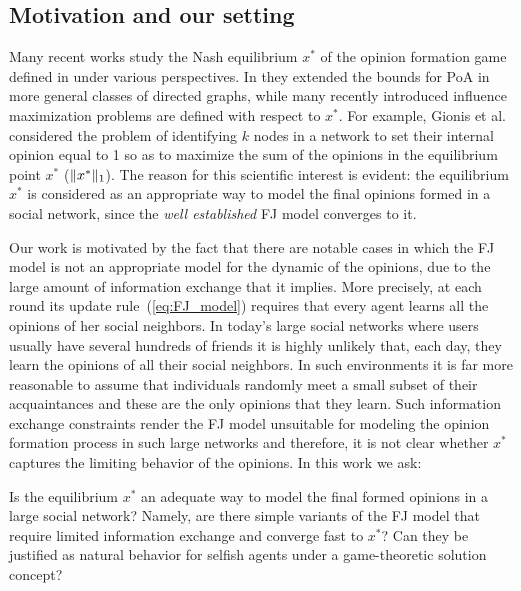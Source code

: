 \subsection{Motivation and our setting}

Many recent works study the Nash equilibrium $x^*$ of the opinion formation
game defined in \cite{BKO11} under various perspectives. In \cite{CCL16} they
extended the bounds for PoA in more general classes of directed graphs, while
many recently introduced influence maximization problems
\cite{GTT13,AKPT18,MMT17} are defined with respect to $x^*$.  For example,
Gionis et al. \cite{GTT13} considered the problem of identifying $k$ nodes in a
network to set their internal opinion equal to 1 so as to maximize the sum of
the opinions in the equilibrium point $x^*$ ($\norm{1}{x^*}$).  The reason for
this scientific interest is evident: the equilibrium $x^*$ is considered as an
appropriate way to model the final opinions formed in a social network, since
the \emph{well established} FJ model converges to it.

Our work is motivated by the fact that there are notable cases in which the FJ
model is not an appropriate model for the dynamic of the opinions, due to the
large amount of information exchange that it implies.  More precisely, at each
round its update rule~(\ref{eq:FJ_model}) requires that every agent learns all
the opinions of her social neighbors.  In today's large social networks where
users usually have several hundreds of friends it is highly unlikely that, each
day, they learn the opinions of all their social neighbors.  In such
environments it is far more reasonable to assume that individuals randomly meet
a small subset of their acquaintances and these are the only opinions that they
learn. Such information exchange constraints render the FJ model unsuitable for
modeling the opinion formation process in such large networks and therefore, it
is not clear whether $x^*$ captures the limiting behavior of the opinions. In
this work we ask:
%
\begin{question}\label{q:motivation1}
  Is the equilibrium $x^*$ an adequate way to model the final formed opinions
  in a large social network? Namely, are there simple variants of the FJ model
  that require limited information exchange and converge fast to $x^*$? Can
  they be justified as natural behavior for selfish agents under a
  game-theoretic solution concept?
\end{question}

